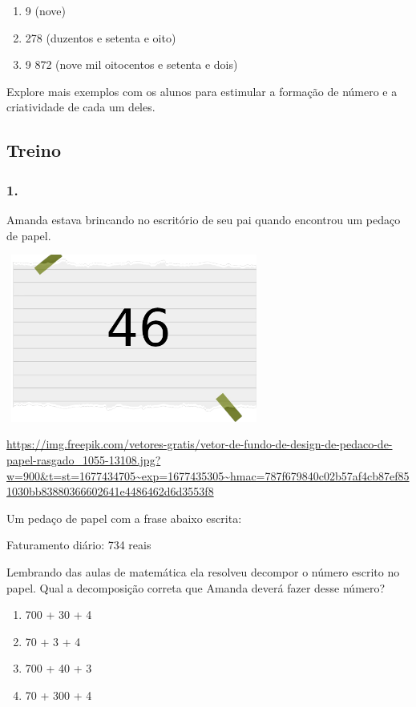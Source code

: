 \begin{enumerate}
\def\labelenumi{\alph{enumi})}
\item
  9 (nove)
\item
  278 (duzentos e setenta e oito)
\item
  9 872 (nove mil oitocentos e setenta e dois)
\end{enumerate}

Explore mais exemplos com os alunos para estimular a formação de número
e a criatividade de cada um deles.

\subsection{Treino}\label{treino}

\subsubsection{1.}\label{section-13}

Amanda estava brincando no escritório de seu pai quando encontrou um
pedaço de papel.

\includegraphics[width=3.30833in,height=2.17391in]{media/image2.png}

\url{https://img.freepik.com/vetores-gratis/vetor-de-fundo-de-design-de-pedaco-de-papel-rasgado_1055-13108.jpg?w=900\&t=st=1677434705~exp=1677435305~hmac=787f679840c02b57af4cb87ef851030bb83880366602641e4486462d6d3553f8}

Um pedaço de papel com a frase abaixo escrita:

Faturamento diário: 734 reais

Lembrando das aulas de matemática ela resolveu decompor o número escrito
no papel. Qual a decomposição correta que Amanda deverá fazer desse
número?

\begin{enumerate}
\def\labelenumi{\alph{enumi})}
\item
  700 + 30 + 4
\item
  70 + 3 + 4
\item
  700 + 40 + 3
\item
  70 + 300 + 4
\end{enumerate}

